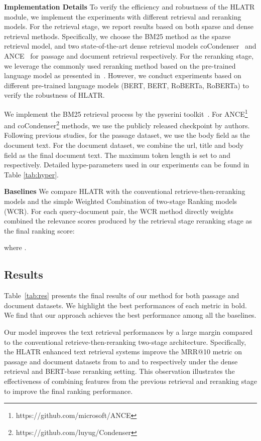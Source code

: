 \documentclass[11pt]{article}
\begin{document}
\noindent \textbf{Implementation Details} To verify the efficiency and robustness of the HLATR module, we implement the experiments with different retrieval and reranking models. For the retrieval stage, we report results based on both sparse and dense retrieval methods. Specifically, we choose the BM25 method as the sparse retrieval model, and two state-of-the-art dense retrieval models coCondenser~\cite{gao2021unsupervised} and ANCE~\cite{xiong2021approximate} for passage and document retrieval respectively. For the reranking stage, we leverage the commonly used reranking method based on the pre-trained language model as presented in~\cite{nogueira2019passage,gao2021rethink}. However, we conduct experiments based on different pre-trained language models (BERT, BERT, RoBERTa, RoBERTa) to verify the robustness of HLATR. 

We implement the BM25 retrieval process by the pyserini toolkit~\cite{lin2021pyserini}. For ANCE\footnote{https://github.com/microsoft/ANCE} and coCondenser\footnote{https://github.com/luyug/Condenser} methods, we use the publicly released checkpoint by authors. Following previous studies, for the passage dataset, we use the body field as the document text. For the document dataset, we combine the url, title and body field as the final document text. The maximum token length is set to  and  respectively. Detailed hype-parameters used in our experiments can be found in Table \ref{tab:hyper}.

\vspace{0.15cm}
\noindent \textbf{Baselines} We compare HLATR with the conventional retrieve-then-reranking models and the simple Weighted Combination of two-stage Ranking models (WCR). For each query-document pair, the WCR method directly weights combined the relevance scores produced by the retrieval stage reranking stage as the final ranking score:

where .


\subsection{Results}
Table~\ref{tab:res} presents the final results of our method for both passage and document datasets. We highlight the best performances of each metric in bold. We find that our approach achieves the best performance among all the baselines.

Our model improves the text retrieval performances by a large margin compared to the conventional retrieve-then-reranking two-stage architecture. Specifically, the HLATR enhanced text retrieval systems improve the MRR@10 metric on passage and document datasets from  to  and  to  respectively under the dense retrieval and BERT-base reranking setting. This observation illustrates the effectiveness of combining features from the previous retrieval and reranking stage to improve the final ranking performance.
\end{document}
